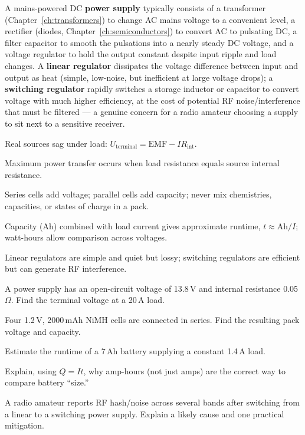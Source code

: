 A mains-powered DC \textbf{power supply} typically consists of a
transformer (Chapter~\ref{ch:transformers}) to change AC mains voltage
to a convenient level, a rectifier (diodes, Chapter~\ref{ch:semiconductors})
to convert AC to pulsating DC, a filter capacitor to smooth the
pulsations into a nearly steady DC voltage, and a voltage regulator to
hold the output constant despite input ripple and load changes. A
\textbf{linear regulator} dissipates the voltage difference between
input and output as heat (simple, low-noise, but inefficient at large
voltage drops); a \textbf{switching regulator} rapidly switches a
storage inductor or capacitor to convert voltage with much higher
efficiency, at the cost of potential RF noise/interference that must be
filtered --- a genuine concern for a radio amateur choosing a supply to
sit next to a sensitive receiver.

\begin{quickreview}
\item Real sources sag under load: $U_{\text{terminal}} = \text{EMF} -
IR_{\text{int}}$.
\item Maximum power transfer occurs when load resistance equals source
internal resistance.
\item Series cells add voltage; parallel cells add capacity; never mix
chemistries, capacities, or states of charge in a pack.
\item Capacity (Ah) combined with load current gives approximate runtime,
$t \approx \text{Ah}/I$; watt-hours allow comparison across voltages.
\item Linear regulators are simple and quiet but lossy; switching
regulators are efficient but can generate RF interference.
\end{quickreview}

\begin{practiceproblems}
\item A power supply has an open-circuit voltage of 13.8\,V and internal
resistance 0.05\,$\Omega$. Find the terminal voltage at a 20\,A load.
\item Four 1.2\,V, 2000\,mAh NiMH cells are connected in series. Find the
resulting pack voltage and capacity.
\item Estimate the runtime of a 7\,Ah battery supplying a constant 1.4\,A
load.
\item Explain, using $Q=It$, why amp-hours (not just amps) are the
correct way to compare battery ``size.''
\item A radio amateur reports RF hash/noise across several bands after
switching from a linear to a switching power supply. Explain a likely
cause and one practical mitigation.
\end{practiceproblems}
